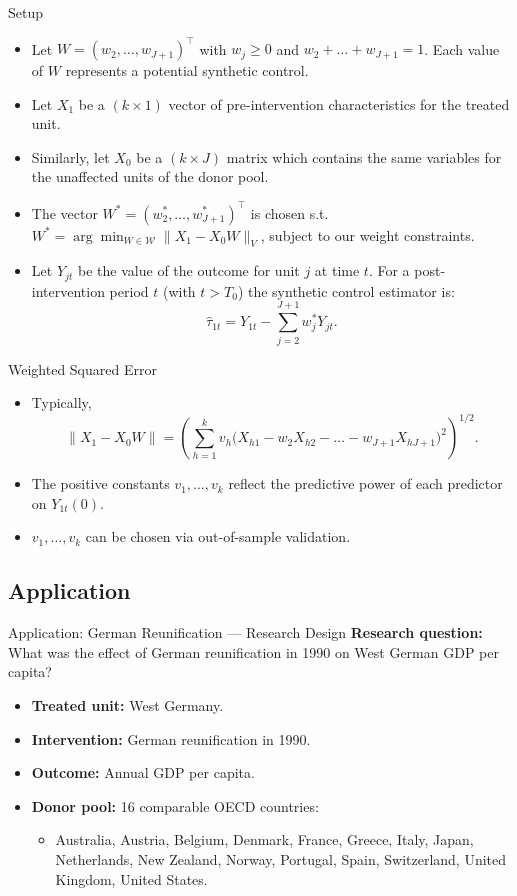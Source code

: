 \documentclass[11pt,aspectratio=169]{beamer}
\begin{document}
\begin{frame}{Setup}
\small
\begin{itemize}
  \item Let $W=(w_2,\dots,w_{J+1})^\top$ with $w_j\ge0$ and $w_2+\dots+w_{J+1}=1$. Each value of $W$ represents a potential synthetic control.
  \item Let $X_1$ be a $(k\times1)$ vector of pre-intervention characteristics for the treated unit.
  \item Similarly, let $X_0$ be a $(k\times J)$ matrix which contains the same variables for the unaffected units of the donor pool.
  \item The vector $W^*=(w_2^*,\dots,w_{J+1}^*)^\top$ is chosen s.t.\ $W^*=\arg\min_{W\in\mathcal{W}}\|X_1-X_0W\|_V$, subject to our weight constraints.
  \item Let $Y_{jt}$ be the value of the outcome for unit $j$ at time $t$. For a post-intervention period $t$ (with $t>T_0$) the synthetic control estimator is:
  \[\widehat\tau_{1t}=Y_{1t}-\sum_{j=2}^{J+1}w_j^*Y_{jt}.\]
\end{itemize}
\end{frame}

\begin{frame}{Weighted Squared Error}
\begin{itemize}
  \item Typically,
  \[\|X_1-X_0W\|=\left(\sum_{h=1}^{k}v_h\bigl(X_{h1}-w_2X_{h2}-\dots-w_{J+1}X_{hJ+1}\bigr)^2\right)^{1/2}.\]
  \item The positive constants $v_1,\dots,v_k$ reflect the predictive power of each predictor on $Y_{1t}(0)$.
  \item $v_1,\dots,v_k$ can be chosen via out-of-sample validation.
\end{itemize}
\end{frame}


\subsection{Application}

\begin{frame}{Application: German Reunification --- Research Design}
\textbf{Research question:} What was the effect of German reunification in 1990 on West German GDP per capita?
\begin{itemize}
  \item \textbf{Treated unit:} West Germany.
  \item \textbf{Intervention:} German reunification in 1990.
  \item \textbf{Outcome:} Annual GDP per capita.
  \item \textbf{Donor pool:} 16 comparable OECD countries:
  \begin{itemize}
    \item Australia, Austria, Belgium, Denmark, France, Greece, Italy, Japan, Netherlands, New Zealand, Norway, Portugal, Spain, Switzerland, United Kingdom, United States.
  \end{itemize}
\end{itemize}
\end{frame}
\end{document}
